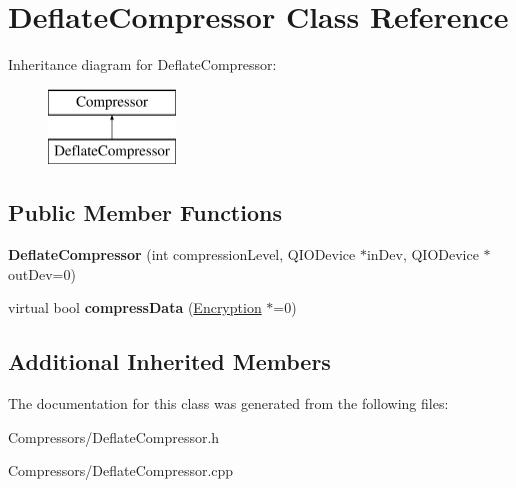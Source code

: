 \hypertarget{class_deflate_compressor}{}\section{Deflate\+Compressor Class Reference}
\label{class_deflate_compressor}
Inheritance diagram for Deflate\+Compressor\+:\begin{figure}[H]
\begin{center}
\leavevmode
\includegraphics[height=2.000000cm]{class_deflate_compressor}
\end{center}
\end{figure}
\subsection*{Public Member Functions}
\begin{DoxyCompactItemize}
\item 
{\bfseries Deflate\+Compressor} (int compression\+Level, Q\+I\+O\+Device $\ast$in\+Dev, Q\+I\+O\+Device $\ast$out\+Dev=0)\hypertarget{class_deflate_compressor_a93a1190af7e548b4fe832874d713f74b}{}\label{class_deflate_compressor_a93a1190af7e548b4fe832874d713f74b}

\item 
virtual bool {\bfseries compress\+Data} (\hyperlink{class_encryption}{Encryption} $\ast$=0)\hypertarget{class_deflate_compressor_a6c6d2bc72e48cd10002e14877bc939ad}{}\label{class_deflate_compressor_a6c6d2bc72e48cd10002e14877bc939ad}

\end{DoxyCompactItemize}
\subsection*{Additional Inherited Members}


The documentation for this class was generated from the following files\+:\begin{DoxyCompactItemize}
\item 
Compressors/Deflate\+Compressor.\+h\item 
Compressors/Deflate\+Compressor.\+cpp\end{DoxyCompactItemize}
